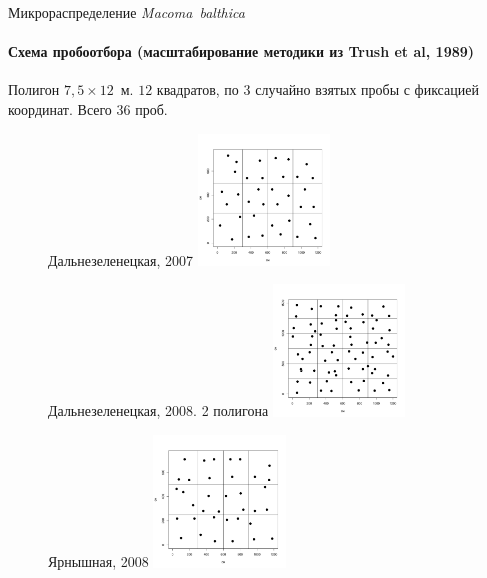 \documentclass{beamer}
\begin{document}
	

\begin{frame}{Микрораспределение {\it Macoma~balthica}}
\framesubtitle{Схема пробоотбора (масштабирование методики из Trush et al, 1989)}
\tiny{Полигон $7,5 \times 12$~м. $12$ квадратов, по $3$ случайно взятых пробы с фиксацией координат. Всего $36$ проб.}
\begin{figure}
	\begin{minipage}[b]{.49\linewidth}
	\begin{center}
\tiny{Дальнезеленецкая, 2007}
\includegraphics[width=35mm]{./microdistribution/Plyazh07_samples.pdf}
	\end{center}
	\end{minipage}
\hfil %
	\begin{minipage}[b]{.49\linewidth}
\begin{center}
\tiny{Дальнезеленецкая, 2008. 2 полигона}
\includegraphics[width=35mm]{./microdistribution/Plyazh08_samples.pdf}
	\end{center}
	\end{minipage}
	\begin{minipage}[b]{.49\linewidth}
	\begin{center}
\tiny{Ярнышная, 2008}
\includegraphics[width=35mm]{./microdistribution/Yarnyshnaya_samples.pdf}
	\end{center}

\end{minipage}
\end{figure}
\end{frame}
\end{document}
